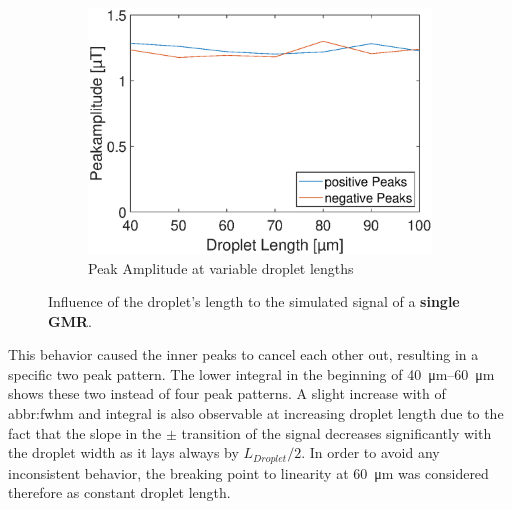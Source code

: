 \begin{figure}[h]
	\vfil
	\begin{subfigure}[r]{0.49\linewidth} 
		\centering
		\includegraphics[clip,trim={0mm 0mm 0mm 0mm}, width=\linewidth]{Ressourcen/Results/L-400/Ampl}
		\caption{Peak Amplitude at variable droplet lengths}
		\label{fig:sim:l:GMR:ampl}
	\end{subfigure}
	\hfil
	\caption{Influence of the droplet's length to the simulated signal of a \textbf{single GMR}.}
	\label{fig:sim:l:GMR}
\end{figure}
\newpage
This behavior caused the inner peaks to cancel each other out, resulting in a specific two peak pattern. The lower integral in the beginning of \SIrange{40}{60}{\micro\meter} shows these two instead of four peak patterns. A slight increase with of \acrshort{abbr:fwhm} and integral is also observable at increasing droplet length due to the fact that the slope in the $\pm$ transition of the signal decreases significantly with the droplet width as it lays always by $L_{Droplet}/2$. In order to avoid any inconsistent behavior, the breaking point to linearity at \SI{60}{\micro\meter} was considered therefore as constant droplet length.

